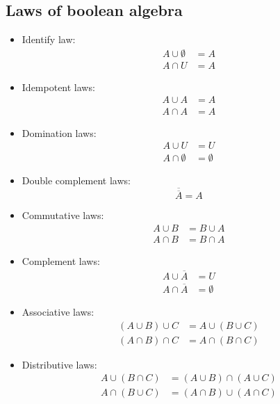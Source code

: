 \documentclass{article}
\begin{document}
\subsection{Laws of boolean algebra}
\begin{itemize}
    \item Identify law: \begin{align*}
              A \cup \emptyset & = A \\
              A \cap U         & = A
          \end{align*}
    \item Idempotent laws: \begin{align*}
              A \cup A & = A \\
              A \cap A & = A
          \end{align*}
    \item Domination laws: \begin{align*}
              A \cup U         & = U         \\
              A \cap \emptyset & = \emptyset
          \end{align*}
    \item Double complement laws: \[
              \overline{\overline{A}} = A
          \]
    \item Commutative laws: \begin{align*}
              A \cup B & = B \cup A \\
              A \cap B & = B \cap A
          \end{align*}
    \item Complement laws: \begin{align*}
              A \cup \overline{A} & = U         \\
              A\cap \overline{A}  & = \emptyset
          \end{align*}
    \item Associative laws: \begin{align*}
              (A\cup B)\cup C & = A\cup(B\cup C)
              \\(A\cap B)\cap C & = A\cap(B\cap C)
          \end{align*}
    \item Distributive laws: \begin{align*}
              A\cup (B\cap C) & = (A\cup B)\cap(A\cup C)
              \\A\cap(B\cup C)& = (A\cap B)\cup(A\cap C)
          \end{align*}

\end{itemize}
\end{document}
